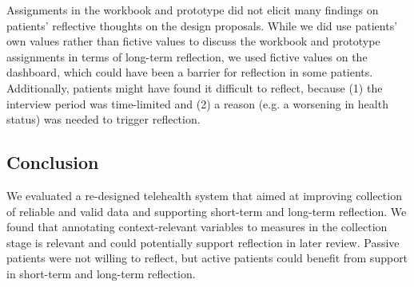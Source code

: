 Assignments in the workbook and prototype did not elicit many findings on patients’ reflective thoughts on the design proposals. While we did use patients’ own values rather than fictive values to discuss the workbook and prototype assignments in terms of long-term reflection, we used fictive values on the dashboard, which could have been a barrier for reflection in some patients. Additionally, patients might have found it difficult to reflect, because (1) the interview period was time-limited and (2) a reason (e.g. a worsening in health status) was needed to trigger reflection. 

\subsection{Conclusion}
We evaluated a re-designed telehealth system that aimed at improving collection of reliable and valid data and supporting short-term and long-term reflection. We found that annotating context-relevant variables to measures in the collection stage is relevant and could potentially support reflection in later review. Passive patients were not willing to reflect, but active patients could benefit from support in short-term and long-term reflection. 